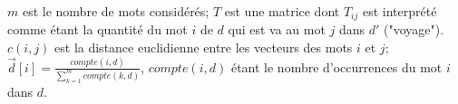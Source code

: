 \begin{itemize}
	$m$ est le nombre de mots considérés; $T$ est une matrice dont $T_{ij}$ est interprété comme étant la quantité du mot $i$ de $d$ qui est va au mot $j$ dans $d'$ ("voyage"). $c(i,j)$ est la distance euclidienne entre les vecteurs des mots $i$ et $j$; $\vec{d}[i] = \frac{compte(i, d)}{\sum\limits_{k=1}^m compte(k, d)}$, $compte(i, d)$ étant le nombre d'occurrences du mot $i$ dans $d$.
	
\end{itemize}


 

